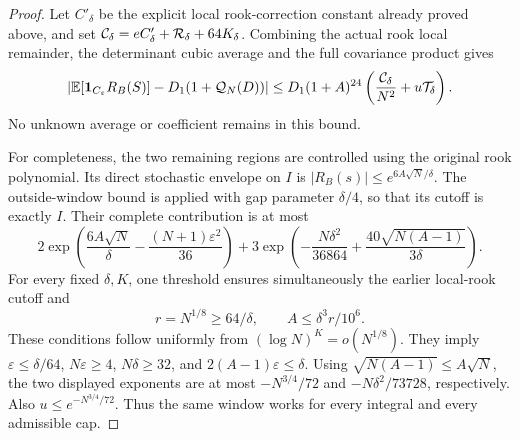 \begin{proof}
Let \(C'_\delta\) be the explicit local rook-correction constant
already proved above, and set
\({\cal C}_\delta=eC'_\delta+{\cal R}_\delta+64K_\delta\).
Combining the actual rook local remainder, the determinant cubic
average and the full covariance product gives
\[
 \left|\mathbb E[\mathbf1_{C_\varepsilon}R_B(S)]
                  -D_1(1+{\cal Q}_N(D))\right|
 \le D_1(1+A)^{24}
                 \left(\frac{{\cal C}_\delta}{N^2}
                                     +u{\cal T}_\delta\right).
\]
No unknown average or coefficient remains in this bound.

For completeness, the two remaining regions are controlled using
the original rook polynomial. Its direct stochastic envelope on \(I\)
is \(|R_B(s)|\le e^{6A\sqrt N/\delta}\).
The outside-window bound is applied with gap parameter \(\delta/4\),
so that its cutoff is exactly \(I\). Their complete contribution is
at most
\[
 2\exp\left(\frac{6A\sqrt N}{\delta}
                         -\frac{(N+1)\varepsilon^2}{36}\right)
 +3\exp\left(-\frac{N\delta^2}{36864}
                   +\frac{40\sqrt{N(A-1)}}{3\delta}\right).
\]
For every fixed \(\delta,K\), one threshold ensures simultaneously
the earlier local-rook cutoff and
\[
 r=N^{1/8}\ge64/\delta,\qquad
       A\le\delta^3r/10^6 .
\]
These conditions follow uniformly from
\((\log N)^K=o(N^{1/8})\).
They imply \(\varepsilon\le\delta/64\),
\(N\varepsilon\ge4\), \(N\delta\ge32\), and
\(2(A-1)\varepsilon\le\delta\).
Using \(\sqrt{N(A-1)}\le A\sqrt N\), the two displayed exponents
are at most \(-N^{3/4}/72\) and \(-N\delta^2/73728\), respectively.
Also \(u\le e^{-N^{3/4}/72}\).
Thus the same window works for every integral and every admissible cap.


\end{proof}
